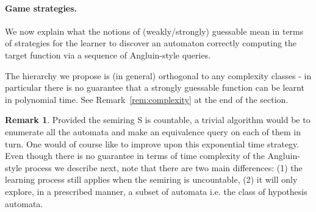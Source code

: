 \documentclass[10pt,a4paper]{amsart}
\theoremstyle{definition}
\newtheorem{rem}[thm]{Remark}
\numberwithin{equation}{section}
\numberwithin{theorem}{section}
\begin{document}
\paragraph*{\textbf{Game strategies.}}

We now explain what the notions of (weakly/strongly) guessable mean in terms of strategies for the learner to discover an automaton correctly computing the target function via a sequence of Angluin-style queries.  

The hierarchy we propose is (in general) orthogonal to any complexity classes - in particular there is no guarantee that a strongly guessable function can be learnt in polynomial time. See Remark~\ref{rem:complexity} at the end of the section.

\begin{rem}
Provided the semiring S is countable, a trivial algorithm would be to enumerate all the automata and make an equivalence query on each of them in turn. One would of course like to improve upon this exponential time strategy. Even though there is no guarantee in terms of time complexity of the Angluin-style process we describe next, note that there are two main differences: (1) the learning process still applies when the semiring is uncountable, (2) it will only explore, in a prescribed manner, a subset of automata i.e. the class of hypothesis automata. 
\end{rem}
\end{document}
